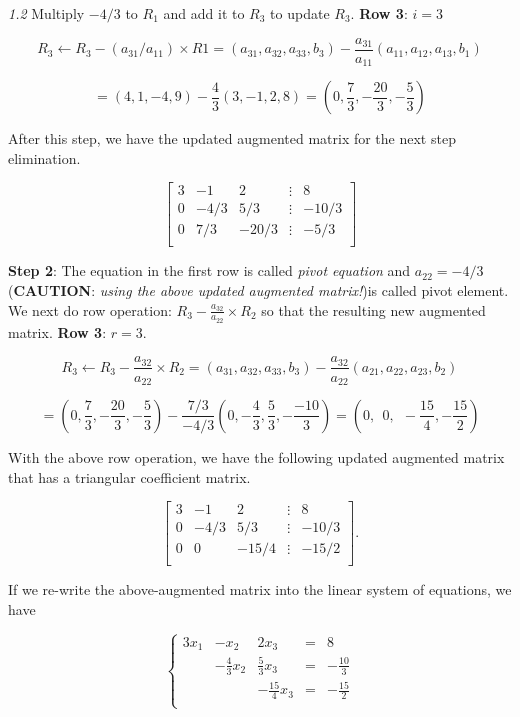 \documentclass[
]{book}
\begin{document}
\emph{1.2} Multiply \(-4/3\) to \(R_1\) and add it to \(R_3\) to update \(R_3.\) \textbf{Row 3}: \(i = 3\)

\[
R_3 \leftarrow R_3 - (a_{31}/a_{11}) \times R1  = (a_{31}, a_{32}, a_{33}, b_3) - \frac{a_{31}}{a_{11}}(a_{11}, a_{12}, a_{13}, b_1) 
\]

\[
=(4,1,-4,9) - \frac{4}{3}(3, -1, 2, 8) = \left(0, \frac{7}{3}, -\frac{20}{3}, -\frac{5}{3} \right)
\]

After this step, we have the updated augmented matrix for the next step elimination.

\[
\left[
\begin{array}{ccccc}
 3 & -1 & 2 & \vdots & 8\\ 
 0 & -4/3 & 5/3 & \vdots & -10/3\\ 
 0 & 7/3 & -20/3 & \vdots & -5/3\\ 
\end{array}
\right]
\]

\textbf{Step 2}: The equation in the first row is called \emph{pivot equation} and \(a_{22} = -4/3\) (\textbf{CAUTION}: \emph{using the above updated augmented matrix!})is called pivot element. We next do row operation: \(R_3 - \frac{a_{32}}{a_{22}}\times R_2\) so that the resulting new augmented matrix. \textbf{Row 3}: \(r = 3\).

\[
R_3 \leftarrow R_3 - \frac{a_{32}}{a_{22}}\times R_2 = (a_{31}, a_{32}, a_{33}, b_3) - \frac{a_{32}}{a_{22}}(a_{21}, a_{22}, a_{23}, b_2)
\]

\[
= \left( 0, \frac{7}{3}, -\frac{20}{3}, -\frac{5}{3}\right) - \frac{7/3}{-4/3}\left(0, -\frac{4}{3}, \frac{5}{3}, -\frac{-10}{3} \right)  = \left(0, ~~0, ~~-\frac{15}{4}, -\frac{15}{2} \right)
\]

With the above row operation, we have the following updated augmented matrix that has a triangular coefficient matrix.

\[
\left[
\begin{array}{ccccc}
 3 & -1 & 2 & \vdots & 8\\ 
 0 & -4/3 & 5/3 & \vdots & -10/3\\ 
 0 & 0 & -15/4 & \vdots & -15/2\\ 
\end{array}
\right].
\]

If we re-write the above-augmented matrix into the linear system of equations, we have

\[
\left\{
\begin{array}{ccccc} 
 3x_1 & - x_2 & 2x_3 & = & 8\\ 
   & -\frac{4}{3}x_2 & \frac{5}{3}x_3 & = & -\frac{10}{3}\\ 
   &  & -\frac{15}{4}x_3 & = & -\frac{15}{2}\\ 
\end{array}
\right.
\]
\end{document}

